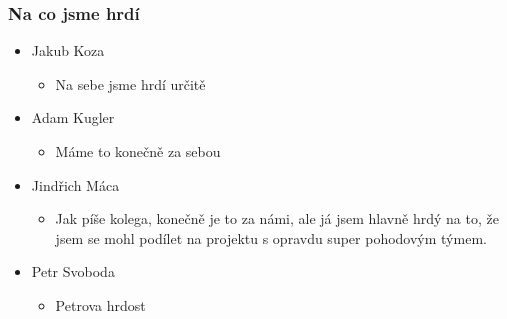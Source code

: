 \documentclass{beamer}
\begin{document}
\begin{frame}[allowframebreaks]\frametitle{Na co jsme hrdí} 
  \begin{itemize}
    \item Jakub Koza
      \begin{itemize}
       \item Na sebe jsme hrdí určitě
     \end{itemize}
   
    \item Adam Kugler
      \begin{itemize}
       \item Máme to konečně za sebou
     \end{itemize}

    \item Jindřich Máca
      \begin{itemize}
       \item Jak píše kolega, konečně je to za námi, ale já jsem hlavně hrdý na to, že jsem se mohl podílet na projektu s opravdu super pohodovým týmem.
      \end{itemize}  
   
    \item Petr Svoboda
      \begin{itemize}
       \item Petrova hrdost
     \end{itemize}
   \end{itemize}  
\end{frame}

   
\end{document}
